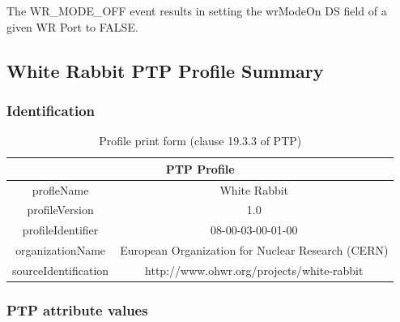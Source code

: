 \documentclass[a4paper, 12pt]{article}
\begin{document}
The WR\_MODE\_OFF event results in setting the wrModeOn DS field of a given WR Port to FALSE.

% 

\newpage

\subsection{White Rabbit PTP Profile Summary}
\subsubsection{Identification}
\label{sec:wrptpProfile}

\begin{table}[ph!]
\caption{Profile print form (clause 19.3.3 of PTP)}
\centering
\begin{tabular}{| c | c |}          					\hline
\multicolumn{2}{|c|}{\textbf{PTP Profile}}  				  \\ \hline
profleName           &  White Rabbit     				  \\ \hline
profileVersion       &  1.0               				  \\ \hline
profileIdentifier    &  08-00-03-00-01-00 				  \\ \hline
organizationName     &  European Organization for Nuclear Research (CERN) \\ \hline
sourceIdentification &  http://www.ohwr.org/projects/white-rabbit         \\ \hline
\end{tabular}
\label{tab:wrPtpProfile}
\end{table}

\subsubsection{PTP attribute values}
\end{document}
